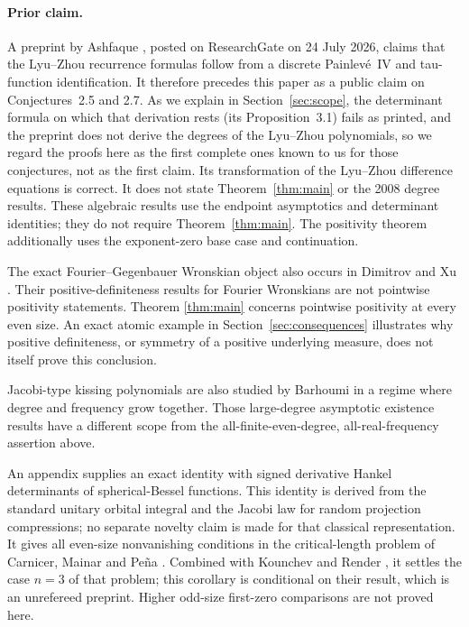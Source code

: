 \documentclass[11pt]{article}
\numberwithin{equation}{section}
\theoremstyle{remark}
\begin{document}
\paragraph{Prior claim.} A preprint by Ashfaque \cite{Ashfaque2026},
posted on ResearchGate on 24 July 2026, claims that the Lyu--Zhou
recurrence formulas follow from a discrete Painlev\'e~IV and
tau-function identification. It therefore precedes this paper as a
public claim on Conjectures~2.5 and 2.7. As we explain in
Section~\ref{sec:scope}, the determinant formula on which that
derivation rests (its Proposition~3.1) fails as printed, and the
preprint does not derive the degrees of the Lyu--Zhou polynomials, so we
regard the proofs here as the first complete ones known to us for those
conjectures, not as the first claim. Its transformation of the Lyu--Zhou
difference equations is correct. It does not state Theorem~\ref{thm:main}
or the 2008 degree results. These algebraic results use the endpoint asymptotics and
determinant identities; they do not require Theorem~\ref{thm:main}.
The positivity theorem additionally uses the exponent-zero base case
and continuation.

The exact Fourier--Gegenbauer Wronskian object also occurs in
Dimitrov and Xu \cite{DimitrovXu2019}. Their positive-definiteness results
for Fourier Wronskians are not pointwise positivity statements. Theorem
\ref{thm:main} concerns pointwise positivity at every even size. An exact
atomic example in Section~\ref{sec:consequences} illustrates why positive
definiteness, or symmetry of a positive underlying measure, does not
itself prove this conclusion.

Jacobi-type kissing polynomials are also studied by Barhoumi
\cite{Barhoumi2021} in a regime where degree and frequency grow together.
Those large-degree asymptotic existence results have a different scope
from the all-finite-even-degree, all-real-frequency assertion above.

An appendix supplies an exact identity with signed derivative Hankel
determinants of spherical-Bessel functions. This identity is derived from
the standard unitary orbital integral and the Jacobi law for random
projection compressions; no separate novelty claim is made for that
classical representation. It gives all even-size nonvanishing conditions
in the critical-length problem of Carnicer, Mainar and Pe\~na
\cite{CMP2023}. Combined with Kounchev and Render
\cite[Corollary~21]{KounchevRender2025}, it settles the case $n=3$ of that
problem; this corollary is conditional on their result, which is an
unrefereed preprint. Higher odd-size first-zero comparisons are not proved here.
\end{document}

